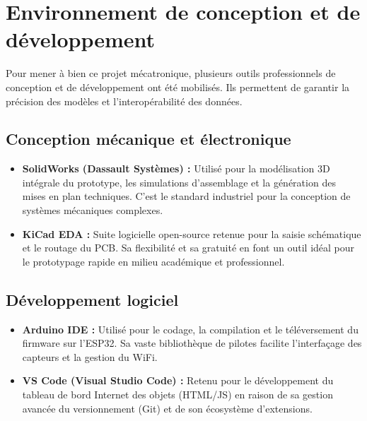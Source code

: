 
\section{Environnement de conception et de développement}
Pour mener à bien ce projet mécatronique, plusieurs outils professionnels de conception et de développement ont été mobilisés. Ils permettent de garantir la précision des modèles et l'interopérabilité des données.

\subsection{Conception mécanique et électronique}
\begin{itemize}
    \item \textbf{SolidWorks (Dassault Systèmes) :} Utilisé pour la modélisation 3D intégrale du prototype, les simulations d'assemblage et la génération des mises en plan techniques. C'est le standard industriel pour la conception de systèmes mécaniques complexes.
    \item \textbf{KiCad EDA :} Suite logicielle open-source retenue pour la saisie schématique et le routage du PCB. Sa flexibilité et sa gratuité en font un outil idéal pour le prototypage rapide en milieu académique et professionnel.
\end{itemize}

\subsection{Développement logiciel}
\begin{itemize}
    \item \textbf{Arduino IDE :} Utilisé pour le codage, la compilation et le téléversement du firmware sur l'ESP32. Sa vaste bibliothèque de pilotes facilite l'interfaçage des capteurs et la gestion du WiFi.
    \item \textbf{VS Code (Visual Studio Code) :} Retenu pour le développement du tableau de bord Internet des objets (HTML/JS) en raison de sa gestion avancée du versionnement (Git) et de son écosystème d'extensions.
\end{itemize}

